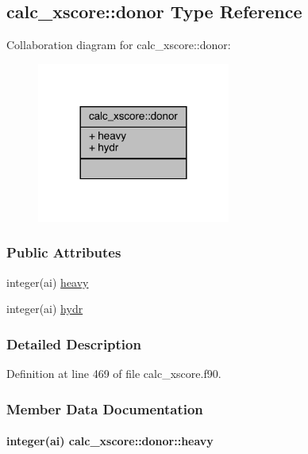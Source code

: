 \hypertarget{structcalc__xscore_1_1donor}{\subsection{calc\-\_\-xscore\-:\-:donor Type Reference}
\label{structcalc__xscore_1_1donor}
}


Collaboration diagram for calc\-\_\-xscore\-:\-:donor\-:
\nopagebreak
\begin{figure}[H]
\begin{center}
\leavevmode
\includegraphics[width=180pt]{structcalc__xscore_1_1donor__coll__graph}
\end{center}
\end{figure}
\subsubsection*{Public Attributes}
\begin{DoxyCompactItemize}
\item 
integer(ai) \hyperlink{structcalc__xscore_1_1donor_aec55fd49bef8734e2fc7720624022f1b}{heavy}
\item 
integer(ai) \hyperlink{structcalc__xscore_1_1donor_aac5a6e49fa34e38cb05c783928bd1104}{hydr}
\end{DoxyCompactItemize}


\subsubsection{Detailed Description}


Definition at line 469 of file calc\-\_\-xscore.\-f90.



\subsubsection{Member Data Documentation}
\hypertarget{structcalc__xscore_1_1donor_aec55fd49bef8734e2fc7720624022f1b}{
\paragraph[{heavy}]{\setlength{\rightskip}{0pt plus 5cm}integer(ai) calc\-\_\-xscore\-::donor\-::heavy}}\label{structcalc__xscore_1_1donor_aec55fd49bef8734e2fc7720624022f1b}



